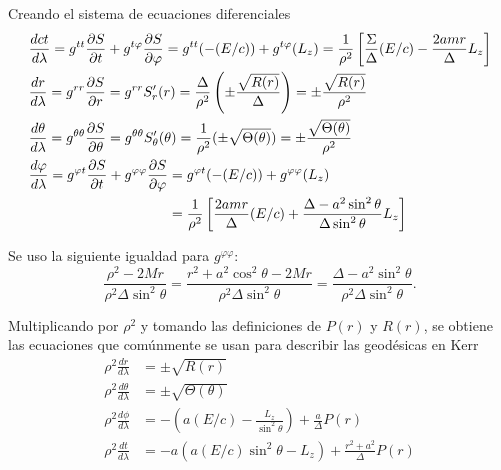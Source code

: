 Creando el sistema de ecuaciones diferenciales
\begin{align}
     & \frac{d ct}{d \lambda}  = g^{t t}\frac{\partial S}{\partial t} + g^{t \varphi}\frac{\partial S}{\partial \varphi} = g^{t t}(-(E/c)) + g^{t \varphi}({L_z}) = \frac{1}{\rho^2}\left[\frac{\Sigma}{\Delta}(E/c) - \frac{2 a m r}{\Delta} {L_z}\right]                \\
     & \frac{d r}{d \lambda}  = g^{r r}\frac{\partial S}{\partial r} = g^{r r} S_r^{\prime}(r) = \frac{\Delta}{\rho^2} \left(\pm \frac{\sqrt{R(r)}}{\Delta}\right) = \pm \frac{\sqrt{R(r)}}{\rho^2}                                                   \\
     & \frac{d \theta}{d \lambda}  = g^{\theta \theta}\frac{\partial S}{\partial \theta} = g^{\theta \theta} S_\theta^{\prime}(\theta) = \frac{1}{\rho^2}(\pm \sqrt{\Theta(\theta )}) = \pm \frac{\sqrt{\Theta(\theta )}}{\rho^2}                   \\
     & \begin{aligned}
           \frac{d \varphi}{d \lambda} = g^{\varphi t}\frac{\partial S}{\partial t} + g^{\varphi \varphi}\frac{\partial S}{\partial \varphi} & = g^{\varphi t}(-(E/c)) + g^{\varphi \varphi}({L_z})                                                                     \\
                                                                                              & = \frac{1}{\rho^2}\left[\frac{2 a m r}{\Delta}(E/c) + \frac{\Delta-a^2 \sin ^2 \theta}{ \Delta \sin ^2 \theta}  {L_z}\right]
       \end{aligned}
\end{align}
\begin{note}
    Se uso la siguiente igualdad para $g^{\varphi \varphi}$:
    $$
        \frac{\rho^2-2 M r}{\rho^2 \Delta \sin ^2 \theta}=\frac{r^2+a^2 \cos ^2 \theta-2 M r}{\rho^2 \Delta \sin ^2 \theta}=\frac{\Delta-a^2 \sin ^2 \theta}{\rho^2 \Delta \sin ^2 \theta} .
    $$
\end{note}
Multiplicando por $\rho ^2$ y tomando las definiciones de $P(r)$ y $R(r)$, se obtiene las ecuaciones que comúnmente se usan para describir las geodésicas en Kerr
\begin{equation}
    \begin{aligned}
        \rho^2 \frac{d r}{d \lambda}      & = \pm \sqrt{R(r)}                                                         \\
        \rho^2 \frac{d \theta}{d \lambda} & = \pm \sqrt{\Theta(\theta)}                                               \\
        \rho^2 \frac{d \phi}{d \lambda}   & =-\left(a (E/c)-\frac{{L_z}}{\sin ^2 \theta}\right)+\frac{a}{\Delta} P(r) \\
        \rho^2 \frac{d t}{d \lambda}      & =-a\left(a (E/c) \sin ^2 \theta-L_z\right)+\frac{r^2+a^2}{\Delta} P(r)
    \end{aligned}
\end{equation}

